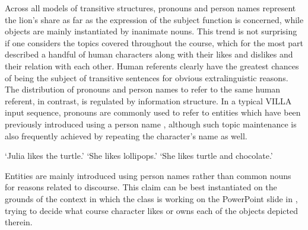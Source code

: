 Across all models of transitive structures, pronouns and person names represent the lion's share as far as the expression of the subject function is concerned, while objects are mainly instantiated by inanimate nouns. This trend is not surprising if one considers the topics covered throughout the course, which for the most part described a handful of human characters along with their likes and dislikes and their relation with each other. Human referents clearly have the greatest chances of being the subject of transitive sentences for obvious extralinguistic reasons. The distribution of pronouns and person names to refer to the same human referent, in contrast, is regulated by information structure. In a typical VILLA input sequence, pronouns are commonly used to refer to entities which have been previously introduced using a person name , although such topic maintenance is also frequently achieved by repeating the character’s name as well.

\ea%
    \label{ex:08:1}
    \glt    ‘Julia likes the turtle.’
    \glt    ‘She likes lollipops.’
    \glt    ‘She likes turtle and chocolate.’
    \z
\z

Entities are mainly introduced using person names rather than common nouns for reasons related to discourse. This claim can be best instantiated on the grounds of the context in which the class is working on the PowerPoint slide in , trying to decide what course character likes or owns each of the objects depicted therein. 

